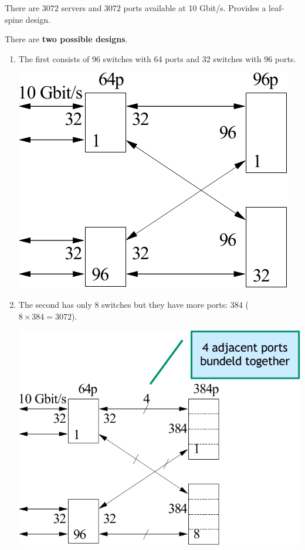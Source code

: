 \begin{examplebox}
    There are $3072$ servers and $3072$ ports available at 10 Gbit/s. Provides a leaf-spine design.

    There are \textbf{two possible designs}.
    \begin{enumerate}
        \item The first consists of 96 switches with 64 ports and 32 switches with 96 ports.
        \begin{center}
            \includegraphics[width=.4\textwidth]{img/networking-6.pdf}
        \end{center}
        
        \item The second has only 8 switches but they have more ports: 384 ($8 \times 384 = 3072$).
        \begin{center}
            \includegraphics[width=.5\textwidth]{img/networking-7.pdf}
        \end{center}
    \end{enumerate}
\end{examplebox}

